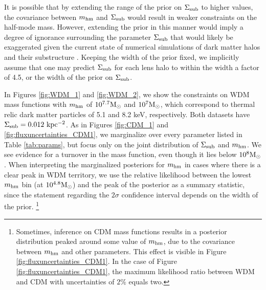 It is possible that by extending the range of the prior on $\Sigma_{\rm{sub}}$ to higher values, the covariance between ${m_{\rm{hm}}}$ and $\Sigma_{\rm{sub}}$ would result in weaker constraints on the half-mode mass. However, extending the prior in this manner would imply a degree of ignorance surrounding the parameter $\Sigma_{\rm{sub}}$ that would likely be exaggerated given the current state of numerical simulations of dark matter halos and their substructure \cite{Benson12,Wheeler++18,Bozek++18,Lovell++18}. Keeping the width of the prior fixed, we implicitly assume that one may predict $\Sigma_{\rm{sub}}$ for each lens halo to within the width a factor of 4.5, or the width of the prior on $\Sigma_{\rm{sub}}$. 

In Figures \ref{fig:WDM_1} and \ref{fig:WDM_2}, we show the constraints on WDM mass functions with ${m_{\rm{hm}}}$ of $10^{7.7} {\rm{M}_{\odot}}$ and $10^{7} {\rm{M}_{\odot}}$, which correspond to thermal relic dark matter particles of 5.1 and 8.2 keV, respectively. Both datasets have $\Sigma_{\rm{sub}} = 0.012 \ \rm{kpc^{-2}}$. As in Figures \ref{fig:CDM_1} and \ref{fig:fluxuncertainties_CDM1}, we marginalize over every parameter listed in Table \ref{tab:params}, but focus only on the joint distribution of $\Sigma_{\rm{sub}}$ and ${m_{\rm{hm}}}$. We see evidence for a turnover in the mass function, even though it lies below $10^8 {\rm{M}_{\odot}}$. When interpreting the marginalized posteriors for ${m_{\rm{hm}}}$ in cases where there is a clear peak in WDM territory, we use the relative likelihood between the lowest ${m_{\rm{hm}}}$ bin (at $10^{4.8}{\rm{M}_{\odot}}$) and the peak of the posterior as a summary statistic, since the statement regarding the $2 \sigma$ confidence interval depends on the width of the prior. \footnote{Sometimes, inference on CDM mass functions results in a posterior distribution peaked around some value of ${m_{\rm{hm}}}$, due to the covariance between ${m_{\rm{hm}}}$ and other parameters. This effect is visible in Figure \ref{fig:fluxuncertainties_CDM1}. In the case of Figure \ref{fig:fluxuncertainties_CDM1}, the maximum likelihood ratio between WDM and CDM with uncertainties of $2\%$ equals two.} 

